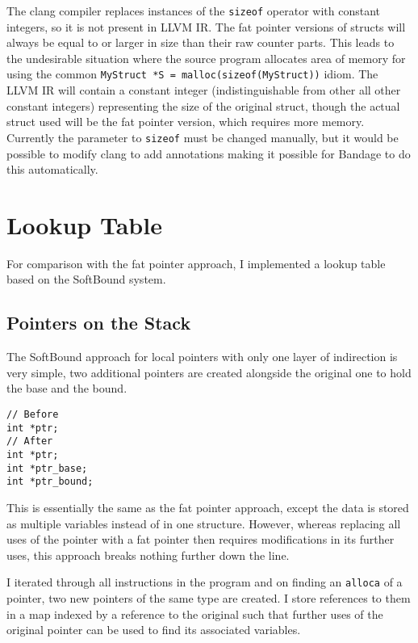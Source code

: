 The clang compiler replaces instances of the \verb!sizeof! operator with constant integers, so it is not present in LLVM IR.
The fat pointer versions of structs will always be equal to or larger in size than their raw counter parts.
This leads to the undesirable situation where the source program allocates area of memory for using the common \verb!MyStruct *S = malloc(sizeof(MyStruct))! idiom.
The LLVM IR will contain a constant integer (indistinguishable from other all other constant integers) representing the size of the original struct, though the actual struct used will be the fat pointer version, which requires more memory.
Currently the parameter to \verb!sizeof! must be changed manually, but it would be possible to modify clang to add annotations making it possible for Bandage to do this automatically.


\section{Lookup Table}

For comparison with the fat pointer approach, I implemented a lookup table based on the SoftBound system.

\subsection{Pointers on the Stack}

The SoftBound approach for local pointers with only one layer of indirection is very simple, two additional pointers are created alongside the original one to hold the base and the bound.

\begin{verbatim}
// Before
int *ptr;
// After
int *ptr;
int *ptr_base;
int *ptr_bound;
\end{verbatim}

This is essentially the same as the fat pointer approach, except the data is stored as multiple variables instead of in one structure.
However, whereas replacing all uses of the pointer with a fat pointer then requires modifications in its further uses, this approach breaks nothing further down the line.

I iterated through all instructions in the program and on finding an \verb!alloca! of a pointer, two new pointers of the same type are created.
I store references to them in a map indexed by a reference to the original such that further uses of the original pointer can be used to find its associated variables.


